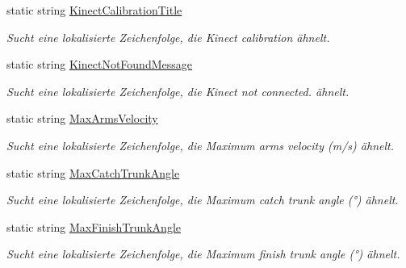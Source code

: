 \begin{DoxyCompactItemize}
static string \hyperlink{class_rowing_monitor_1_1_properties_1_1_resources_a609ea52354bf88d51d0cebd9bd48de8d}{Kinect\+Calibration\+Title}
\begin{DoxyCompactList}\small\item\em Sucht eine lokalisierte Zeichenfolge, die Kinect calibration ähnelt. \end{DoxyCompactList}\item 
static string \hyperlink{class_rowing_monitor_1_1_properties_1_1_resources_a33975b96d05a09f0d029609632c10ff9}{Kinect\+Not\+Found\+Message}
\begin{DoxyCompactList}\small\item\em Sucht eine lokalisierte Zeichenfolge, die Kinect not connected. ähnelt. \end{DoxyCompactList}\item 
static string \hyperlink{class_rowing_monitor_1_1_properties_1_1_resources_a24ae603ed8d743173db5ad95422f1b43}{Max\+Arms\+Velocity}
\begin{DoxyCompactList}\small\item\em Sucht eine lokalisierte Zeichenfolge, die Maximum arms velocity (m/s) ähnelt. \end{DoxyCompactList}\item 
static string \hyperlink{class_rowing_monitor_1_1_properties_1_1_resources_a719188712de0b0ca68430d55ef6e056a}{Max\+Catch\+Trunk\+Angle}
\begin{DoxyCompactList}\small\item\em Sucht eine lokalisierte Zeichenfolge, die Maximum catch trunk angle (°) ähnelt. \end{DoxyCompactList}\item 
static string \hyperlink{class_rowing_monitor_1_1_properties_1_1_resources_ab2e04d859eccef5e7fe84566c5d19a9e}{Max\+Finish\+Trunk\+Angle}
\begin{DoxyCompactList}\small\item\em Sucht eine lokalisierte Zeichenfolge, die Maximum finish trunk angle (°) ähnelt. \end{DoxyCompactList}\item 

\end{DoxyCompactItemize}
